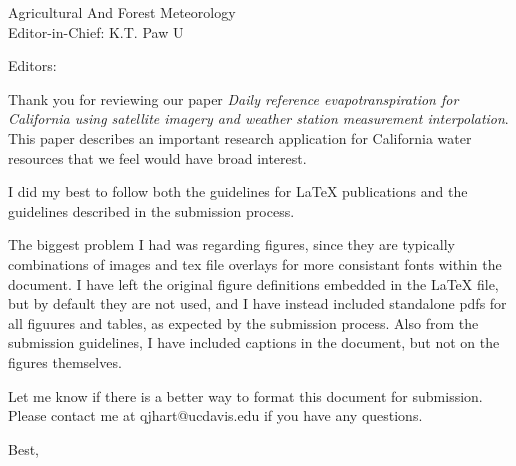 \documentclass{letter}
\begin{document}
\begin{letter}{Agricultural And Forest Meteorology \\	
Editor-in-Chief: K.T. Paw U }
  \opening{Editors:}

  Thank you for reviewing our paper \emph{Daily reference
    evapotranspiration for California using satellite imagery and
    weather station measurement interpolation}.  This paper describes
  an important research application for California water resources
  that we feel would have broad interest.

  I did my best to follow both the guidelines for LaTeX publications
  and the guidelines described in the submission process.

  The biggest problem I had was regarding figures, since they are
  typically combinations of images and tex file overlays for more
  consistant fonts within the document.  I have left the original
  figure definitions embedded in the LaTeX file, but by default they
  are not used, and I have instead included standalone pdfs for all
  figuures and tables, as expected by the submission process.  Also
  from the submission guidelines, I have included captions in the
  document, but not on the figures themselves.

  Let me know if there is a better way to format this document for
  submission.  Please contact me at qjhart@ucdavis.edu if you have any
  questions.

  \closing{Best,}
 \end{letter}
\end{document}
